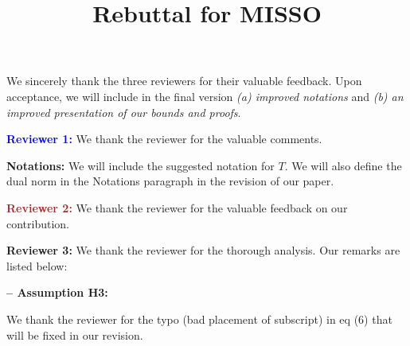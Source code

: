 \documentclass[wcp]{jmlr}
\title[]{Rebuttal for MISSO }
\begin{document}
\maketitle


We sincerely thank the three reviewers for their valuable feedback. 
Upon acceptance, we will include in the final version \emph{{\sf (a)} improved notations} and \emph{{\sf (b)} an improved presentation of our bounds and proofs}. 


\vspace{0.05in}

\textbf{\textcolor{blue}{Reviewer 1:}} We thank the reviewer for the valuable comments.\vspace{-5pt}

\medskip

\textbf{Notations:} 
We will include the suggested notation for $T$.
We will also define the dual norm in the Notations paragraph in the revision of our paper.

\vspace{0.05in}

\textbf{\textcolor{brown}{Reviewer 2:}} We thank the reviewer for the valuable feedback on our contribution.

\vspace{0.05in}

\textbf{\textcolor{green!50!black}{Reviewer 3:}} We thank the reviewer for the thorough analysis. Our remarks are listed below:\vspace{-5pt}

\medskip
\textbf{-- Assumption H3:}

We thank the reviewer for the typo (bad placement of subscript) in eq (6) that will be fixed in our revision.
\end{document}
